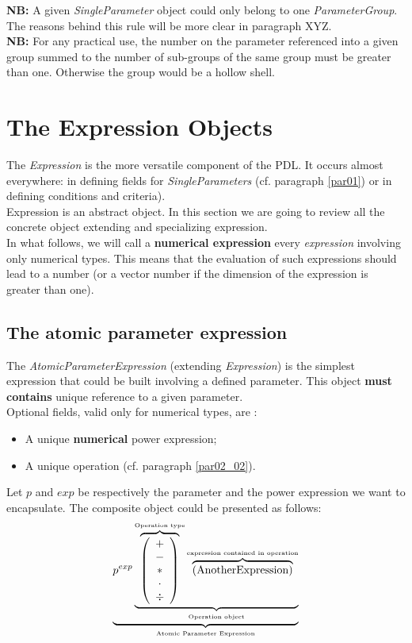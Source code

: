 \documentclass[a4paper,11pt] {article}
\begin{document}
{\bf NB:} A given {\it SingleParameter} object could only belong to one {\it ParameterGroup}. The reasons behind this rule will be more clear in paragraph XYZ.\\

{\bf NB:}  For any practical use, the number on the parameter referenced into a given group summed to the number of sub-groups of the same group must be greater than one. Otherwise the group would be a hollow shell.


\section{The Expression Objects}\label{par02}
The {\it Expression} is the more versatile component of the PDL. It occurs almost everywhere: in defining fields for {\it SingleParameters} (cf. paragraph \ref{par01}) or in defining conditions and criteria).\\
Expression is an abstract object. In this section we are going to review all the concrete object extending and specializing expression.\\

 In what follows, we will call a {\bf numerical expression} every {\it expression} involving only numerical types. This means that the evaluation of such expressions should lead to a number (or a vector number if the dimension of the expression is greater than one).\\


\subsection{The atomic parameter expression}\label{par02_01}
The {\it AtomicParameterExpression} (extending {\it Expression}) is the simplest expression that could be built involving a defined parameter. This object {\bf must contains} unique reference to a given parameter.\\

Optional fields, valid only for numerical types, are : 
\begin{itemize}
\item A unique {\bf numerical} power expression;
\item A unique operation (cf. paragraph \ref{par02_02}).\\
\end{itemize}
Let $p$ and $exp$ be respectively the parameter and the power expression we want to encapsulate. The composite object could be presented as follows:
\begin{equation}\label{eq01}
 \underbrace{  p^{exp} \underbrace{  \overbrace{\left( \begin{array}{c} + \\ - \\ \ast  \\ \cdot \\ \div   \end{array} \right) }^{\mbox{\tiny Operation type}}
 \overbrace{    \left( \mbox{AnotherExpression}\right) }^{\mbox{\tiny expression contained in operation}}   }_{\mbox{\tiny Operation object}}}_{\mbox{\tiny Atomic Parameter Expression}}
\end{equation}
\end{document}

